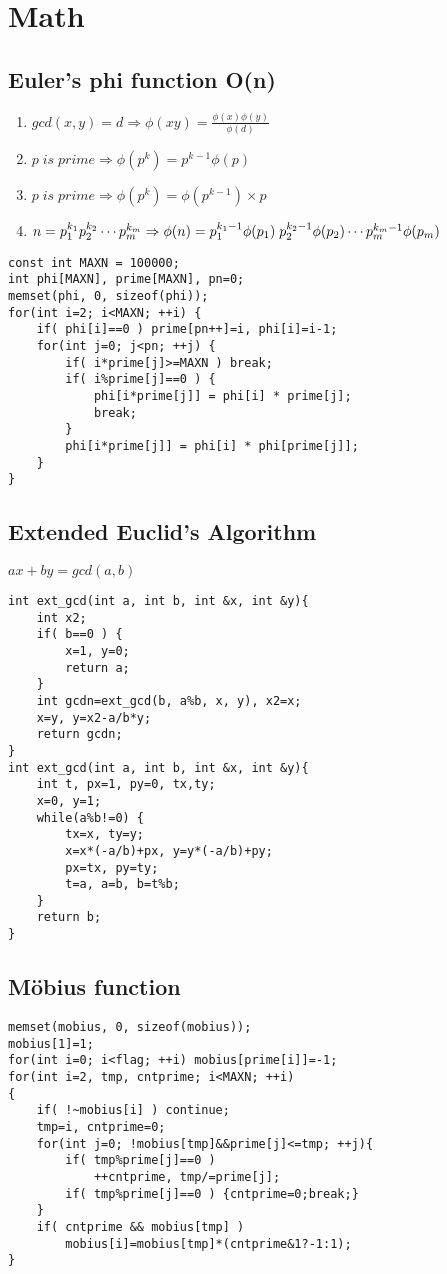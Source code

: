 \documentclass[11pt,twocolumn,a4paper]{article}
\begin{document}
\newpage
\section{Math}
\subsection{Euler's phi function O(n)}
\begin{enumerate}[1.]
\item $gcd(x,y)=d \Rightarrow \phi(xy) = \frac{\phi(x) \phi(y)}{\phi(d)}$
\item $p\; is\; prime \Rightarrow \phi(p^k) = p^{k-1} \phi(p)$
\item $p\; is\; prime \Rightarrow \phi(p^k) = \phi(p^{k-1}) \times p$
\item $n = p_{1}^{k_1} p_{2}^{k_2} \cdots p_{m}^{k_m}\\
\Rightarrow \phi(n) = p_{1}^{k_1-1}\phi(p_1)\; p_{2}^{k_2-1}\phi(p_2) \cdots p_{m}^{k_m-1}\phi(p_m)$
\end{enumerate}

\begin{lstlisting}[label=Euler's phi function O(n)]
const int MAXN = 100000;
int phi[MAXN], prime[MAXN], pn=0;
memset(phi, 0, sizeof(phi));
for(int i=2; i<MAXN; ++i) {
	if( phi[i]==0 ) prime[pn++]=i, phi[i]=i-1;
	for(int j=0; j<pn; ++j) {
		if( i*prime[j]>=MAXN ) break;
		if( i%prime[j]==0 ) {
			phi[i*prime[j]] = phi[i] * prime[j];
			break;
		}
		phi[i*prime[j]] = phi[i] * phi[prime[j]];
	}
}
\end{lstlisting}

\subsection{Extended Euclid's Algorithm}
$ ax+by=gcd(a,b) $
\begin{lstlisting}[label=Extended Euclid's Algorithm]
int ext_gcd(int a, int b, int &x, int &y){
	int x2;
	if( b==0 ) {
		x=1, y=0;
		return a;
	}
	int gcdn=ext_gcd(b, a%b, x, y), x2=x;
	x=y, y=x2-a/b*y;
	return gcdn;
}
int ext_gcd(int a, int b, int &x, int &y){
	int t, px=1, py=0, tx,ty;
	x=0, y=1;
	while(a%b!=0) {
		tx=x, ty=y;
		x=x*(-a/b)+px, y=y*(-a/b)+py;
		px=tx, py=ty;
		t=a, a=b, b=t%b;
	}
	return b;
}
\end{lstlisting}

\subsection{Möbius function}
\begin{lstlisting}[label=Möbius function]
memset(mobius, 0, sizeof(mobius));
mobius[1]=1;
for(int i=0; i<flag; ++i) mobius[prime[i]]=-1;
for(int i=2, tmp, cntprime; i<MAXN; ++i)
{
	if( !~mobius[i] ) continue;
	tmp=i, cntprime=0;
	for(int j=0; !mobius[tmp]&&prime[j]<=tmp; ++j){
		if( tmp%prime[j]==0 )
			++cntprime, tmp/=prime[j];
		if( tmp%prime[j]==0 ) {cntprime=0;break;}
	}
	if( cntprime && mobius[tmp] )
		mobius[i]=mobius[tmp]*(cntprime&1?-1:1);
}
\end{lstlisting}
\end{document}
